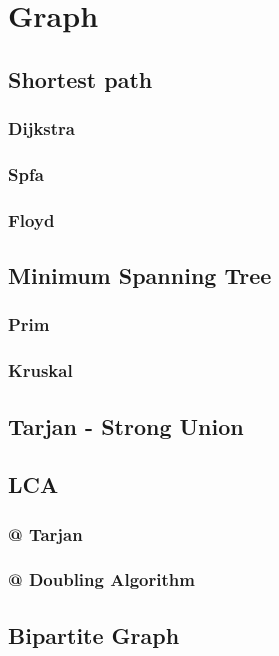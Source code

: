 \section{Graph}
	\subsection{Shortest path}
		\subsubsection{Dijkstra}
			
		\subsubsection{Spfa}
			
		\subsubsection{Floyd}
			
	\subsection{Minimum Spanning Tree}
		\subsubsection{Prim}
			
		\subsubsection{Kruskal}
			
	\subsection{Tarjan - Strong Union}
		
	\subsection{LCA}
		\subsubsection{@ Tarjan}
			
		\subsubsection{@ Doubling Algorithm}
			
	\subsection{Bipartite Graph}
